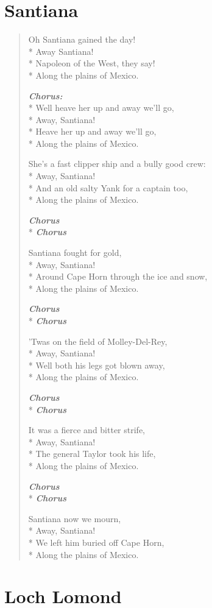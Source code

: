 \documentclass[9pt,twoside]{extarticle}
\makeatletter
\newenvironment{xverse}{
	\begin{verse}
	\fontsize{8.5}{10.5}\selectfont
}{
	\end{verse}
}
\newcommand{\chorusdef}{\textbf{\emph{Chorus:}}\\*}
\newcommand{\chorus@mark}[1][1]{%
\textbf{\emph{Chorus \ifthenelse{\equal{#1}{1}}{}{$\times$ #1}}}%
}
\newcommand{\chorusmark}[1][1]{%
\ifvmode%
\vspace{-0.5\stanzaskip}%
\chorus@mark[#1]%
\vspace{-0.5\stanzaskip}%
\else \\*%
\chorus@mark[#1]%
\fi%
}
\makeatother
\begin{document}
\section{Santiana}
\begin{xverse}
Oh Santiana gained the day! \\*
Away Santiana! \\*
Napoleon of the West, they say! \\*
Along the plains of Mexico.

\chorusdef
Well heave her up and away we’ll go, \\*
Away, Santiana! \\*
Heave her up and away we’ll go, \\*
Along the plains of Mexico.

She’s a fast clipper ship and a bully good crew: \\*
Away, Santiana! \\*
And an old salty Yank for a captain too, \\*
Along the plains of Mexico.

\chorusmark

Santiana fought for gold, \\*
Away, Santiana! \\*
Around Cape Horn through the ice and snow, \\*
Along the plains of Mexico.

\chorusmark

’Twas on the field of Molley-Del-Rey, \\*
Away, Santiana! \\*
Well both his legs got blown away, \\*
Along the plains of Mexico.

\chorusmark

It was a fierce and bitter strife, \\*
Away, Santiana! \\*
The general Taylor took his life, \\*
Along the plains of Mexico.

\chorusmark

Santiana now we mourn, \\*
Away, Santiana! \\*
We left him buried off Cape Horn, \\*
Along the plains of Mexico.
\end{xverse}


\section{Loch Lomond}
\end{document}

